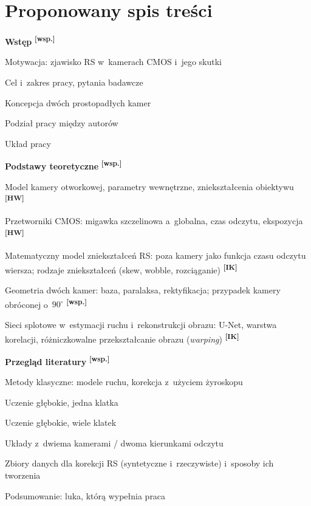 \documentclass[11pt,a4paper]{article}
\newcommand{\IK}{\textsuperscript{\textbf{[IK]}}}
\newcommand{\HW}{\textsuperscript{\textbf{[HW]}}}
\newcommand{\WS}{\textsuperscript{\textbf{[wsp.]}}}
\begin{document}
\section*{Proponowany spis treści}

\begin{toc}
\item \textbf{Wstęp} \WS
  \begin{toc}
    \item Motywacja: zjawisko RS w~kamerach CMOS i~jego skutki
    \item Cel i~zakres pracy, pytania badawcze
    \item Koncepcja dwóch prostopadłych kamer
    \item Podział pracy między autorów
    \item Układ pracy
  \end{toc}

\item \textbf{Podstawy teoretyczne} \WS
  \begin{toc}
    \item Model kamery otworkowej, parametry wewnętrzne, zniekształcenia obiektywu \HW
    \item Przetworniki CMOS: migawka szczelinowa a~globalna, czas odczytu, ekspozycja \HW
    \item Matematyczny model zniekształceń RS: poza kamery jako funkcja czasu odczytu wiersza;
          rodzaje zniekształceń (skew, wobble, rozciąganie) \IK
    \item Geometria dwóch kamer: baza, paralaksa, rektyfikacja; przypadek kamery obróconej o~$90^\circ$ \WS
    \item Sieci splotowe w~estymacji ruchu i~rekonstrukcji obrazu: U-Net, warstwa korelacji,
          różniczkowalne przekształcanie obrazu (\emph{warping}) \IK
  \end{toc}

\item \textbf{Przegląd literatury} \WS
  \begin{toc}
    \item Metody klasyczne: modele ruchu, korekcja z~użyciem żyroskopu
    \item Uczenie głębokie, jedna klatka
    \item Uczenie głębokie, wiele klatek
    \item Układy z~dwiema kamerami / dwoma kierunkami odczytu
    \item Zbiory danych dla korekcji RS (syntetyczne i~rzeczywiste) i~sposoby ich tworzenia
    \item Podsumowanie: luka, którą wypełnia praca
  \end{toc}


\end{toc}
\end{document}
